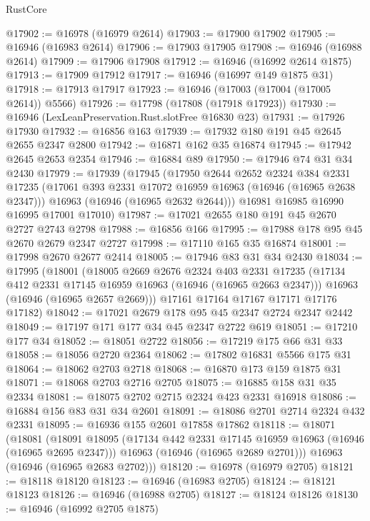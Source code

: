 \begin{lexlean}{RustCore}
\begin{coremodule}
@17902 := @16978 (@16979 @2614)
@17903 := @17900 @17902
@17905 := @16946 (@16983 @2614)
@17906 := @17903 @17905
@17908 := @16946 (@16988 @2614)
@17909 := @17906 @17908
@17912 := @16946 (@16992 @2614 @1875)
@17913 := @17909 @17912
@17917 := @16946 (@16997 @149 @1875 @31)
@17918 := @17913 @17917
@17923 := @16946 (@17003 (@17004 (@17005 @2614)) @5566)
@17926 := @17798 (@17808 (@17918 @17923))
@17930 := @16946 (LexLeanPreservation.Rust.slotFree @16830 @23)
@17931 := @17926 @17930
@17932 := @16856 @163
@17939 := @17932 @180 @191 @45 @2645 @2655 @2347 @2800
@17942 := @16871 @162 @35 @16874
@17945 := @17942 @2645 @2653 @2354
@17946 := @16884 @89
@17950 := @17946 @74 @31 @34 @2430
@17979 := @17939
    (@17945
      (@17950
        @2644
        @2652
        @2324
        @384
        @2331
        @17235
        (@17061 @393 @2331 @17072 @16959 @16963 (@16946 (@16965 @2638 @2347)))
        @16963
        (@16946 (@16965 @2632 @2644)))
      @16981
      @16985
      @16990
      @16995
      @17001
      @17010)
@17987 := @17021 @2655 @180 @191 @45 @2670 @2727 @2743 @2798
@17988 := @16856 @166
@17995 := @17988 @178 @95 @45 @2670 @2679 @2347 @2727
@17998 := @17110 @165 @35 @16874
@18001 := @17998 @2670 @2677 @2414
@18005 := @17946 @83 @31 @34 @2430
@18034 := @17995
    (@18001
      (@18005
        @2669
        @2676
        @2324
        @403
        @2331
        @17235
        (@17134 @412 @2331 @17145 @16959 @16963 (@16946 (@16965 @2663 @2347)))
        @16963
        (@16946 (@16965 @2657 @2669)))
      @17161
      @17164
      @17167
      @17171
      @17176
      @17182)
@18042 := @17021 @2679 @178 @95 @45 @2347 @2724 @2347 @2442
@18049 := @17197 @171 @177 @34 @45 @2347 @2722 @619
@18051 := @17210 @177 @34
@18052 := @18051 @2722
@18056 := @17219 @175 @66 @31 @33
@18058 := @18056 @2720 @2364
@18062 := @17802 @16831 @5566 @175 @31
@18064 := @18062 @2703 @2718
@18068 := @16870 @173 @159 @1875 @31
@18071 := @18068 @2703 @2716 @2705
@18075 := @16885 @158 @31 @35 @2334
@18081 := @18075 @2702 @2715 @2324 @423 @2331 @16918
@18086 := @16884 @156 @83 @31 @34 @2601
@18091 := @18086 @2701 @2714 @2324 @432 @2331
@18095 := @16936 @155 @2601 @17858 @17862
@18118 := @18071
    (@18081
      (@18091
        @18095
        (@17134 @442 @2331 @17145 @16959 @16963 (@16946 (@16965 @2695 @2347)))
        @16963
        (@16946 (@16965 @2689 @2701)))
      @16963
      (@16946 (@16965 @2683 @2702)))
@18120 := @16978 (@16979 @2705)
@18121 := @18118 @18120
@18123 := @16946 (@16983 @2705)
@18124 := @18121 @18123
@18126 := @16946 (@16988 @2705)
@18127 := @18124 @18126
@18130 := @16946 (@16992 @2705 @1875)

\end{coremodule}
\end{lexlean}
